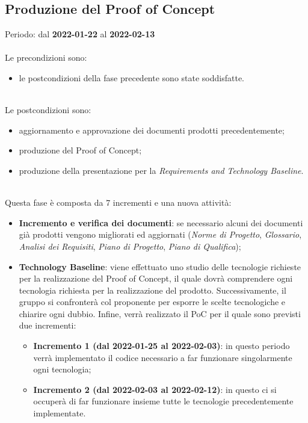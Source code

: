 \subsection{Produzione del Proof of Concept}
Periodo: dal \textbf{2022-01-22} al \textbf{2022-02-13}  \mbox{} \\ \mbox{} \\
Le precondizioni sono:
\begin{itemize}
    \item le postcondizioni della fase precedente sono state soddisfatte.
\end{itemize}  \mbox{} \\
Le postcondizioni sono:
\begin{itemize}
    \item aggiornamento e approvazione dei documenti prodotti precedentemente;
    \item produzione del Proof of Concept;
    \item produzione della presentazione per la \textit{Requirements and Technology Baseline}.
\end{itemize} \mbox{} \\
Questa fase è composta da 7 incrementi e una nuova attività:
\begin{itemize}
    \item \textbf{Incremento e verifica dei documenti}: se necessario alcuni dei documenti già prodotti vengono migliorati ed aggiornati (\textit{Norme di Progetto}, \textit{Glossario},
    \textit{Analisi dei Requisiti}, \textit{Piano di Progetto}, \textit{Piano di Qualifica});
    \item \textbf{Technology Baseline}: viene effettuato uno studio delle tecnologie richieste per la realizzazione del Proof of Concept, il quale dovrà comprendere ogni tecnologia richiesta per la realizzazione del prodotto. Successivamente, il gruppo si confronterà col proponente per esporre le scelte tecnologiche e chiarire ogni dubbio. Infine, verrà realizzato il PoC per il quale sono previsti due incrementi:
    \begin{itemize}
        \item \textbf{Incremento 1 (dal 2022-01-25 al 2022-02-03)}: in questo periodo verrà implementato il codice necessario a far funzionare singolarmente ogni tecnologia;
        \item \textbf{Incremento 2 (dal 2022-02-03 al 2022-02-12)}: in questo ci si occuperà di far funzionare insieme tutte le tecnologie precedentemente implementate.
    \end{itemize}
\end{itemize}

